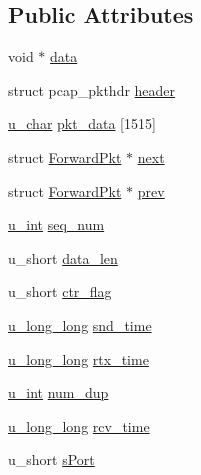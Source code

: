 \subsection*{\-Public \-Attributes}
\begin{DoxyCompactItemize}
\item 
void $\ast$ \hyperlink{structForwardPkt_a2e4d0793dc8830d17f823d5979f3261f}{data}
\item 
struct pcap\-\_\-pkthdr \hyperlink{structForwardPkt_a302fdd75ab8fb5a475bc9a0c21db4fb7}{header}
\item 
\hyperlink{split__tcp__gateway_8h_ae2b02ed168fc99cff3851603910b1fb6}{u\-\_\-char} \hyperlink{structForwardPkt_a3380962962774ae93f297052fafc7a30}{pkt\-\_\-data} \mbox{[}1515\mbox{]}
\item 
struct \hyperlink{structForwardPkt}{\-Forward\-Pkt} $\ast$ \hyperlink{structForwardPkt_a2147e5e35be17cd44b4d0118dbad71a8}{next}
\item 
struct \hyperlink{structForwardPkt}{\-Forward\-Pkt} $\ast$ \hyperlink{structForwardPkt_adae10cd3e262e7a0cd274f8879e72180}{prev}
\item 
\hyperlink{split__tcp__gateway_8h_ac319c165d52643e43249fe003e18bdf3}{u\-\_\-int} \hyperlink{structForwardPkt_a20a35b6a4f29d9f73700ee47c0f64dcc}{seq\-\_\-num}
\item 
u\-\_\-short \hyperlink{structForwardPkt_a57122c5602fe8f2707c3720317f3ee80}{data\-\_\-len}
\item 
u\-\_\-short \hyperlink{structForwardPkt_a247f9e1e1c5f32d28229ef8ed8d31fc0}{ctr\-\_\-flag}
\item 
\hyperlink{split__tcp__gateway_8h_ae16666ecf73bb70201bc64a6ccc329f1}{u\-\_\-long\-\_\-long} \hyperlink{structForwardPkt_a295be2ad5f6a02351220a61f220b595f}{snd\-\_\-time}
\item 
\hyperlink{split__tcp__gateway_8h_ae16666ecf73bb70201bc64a6ccc329f1}{u\-\_\-long\-\_\-long} \hyperlink{structForwardPkt_a814c519962506223c23fda2c5c575182}{rtx\-\_\-time}
\item 
\hyperlink{split__tcp__gateway_8h_ac319c165d52643e43249fe003e18bdf3}{u\-\_\-int} \hyperlink{structForwardPkt_ae0a13cdbb57b256782d476e052a04b13}{num\-\_\-dup}
\item 
\hyperlink{split__tcp__gateway_8h_ae16666ecf73bb70201bc64a6ccc329f1}{u\-\_\-long\-\_\-long} \hyperlink{structForwardPkt_aafcfa8214f837f5ed5b2a645dd31e753}{rcv\-\_\-time}
\item 
u\-\_\-short \hyperlink{structForwardPkt_a303504046c1d8f05b2a026da7e5a45ec}{s\-Port}
\item 

\end{DoxyCompactItemize}
